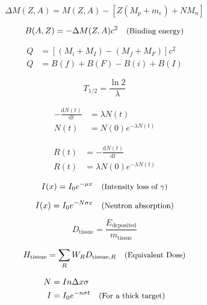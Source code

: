 \begin{equation}
    \Delta M(Z, A) = M(Z,A) - [Z(M_{p} + m_{e}) + NM_n]
\end{equation}

\begin{equation}
    B(A,Z) = -\Delta M(Z,A)c^{2} \quad\text{{\small(Binding energy)}}
\end{equation}

\begin{align}
    Q &= [(M_{i} + M_{I}) - (M_{f} + M_{F})]c^{2} \\
    Q &= B(f) + B(F) - B(i) + B(I)
\end{align}

\begin{equation}
    T_{1/2} = \frac{\ln 2}{\lambda}
\end{equation}

\begin{align}
    - \frac{\mathrm{d} N(t)}{\mathrm{d} t} &= \lambda N(t) \\
    N(t) &= N(0)e^{- \lambda N(t)}
\end{align}

\begin{align}
    R(t) &= - \frac{\mathrm{d} N(t)}{\mathrm{d}t} \\
    R(t) &= \lambda N(0) e^{- \lambda N(t)}
\end{align}

\begin{equation}
    I(x) = I_{0} e^{- \mu x} \quad\text{{\small(Intensity loss of $\gamma$)}}
\end{equation}

\begin{equation}
    I(x) = I_{0} e^{-N \sigma x} \quad\text{{\small(Neutron absorption)}}
\end{equation}

\begin{equation}
    D_{\mathrm{tissue}} = \frac{E_{\mathrm{deposited}}}{m_{\mathrm{tissue}}}
\end{equation}

\begin{equation}
    H_{\mathrm{tissue}} = \sum_{R} W_{R} D_{\mathrm{tissue},R} \quad\text{{\small(Equivalent Dose)}}
\end{equation}

\begin{align}
    N &= I n \Delta x \sigma \\
    I &= I_{0} e^{-n\sigma t} \quad\text{{\small(For a thick target)}}
\end{align}

